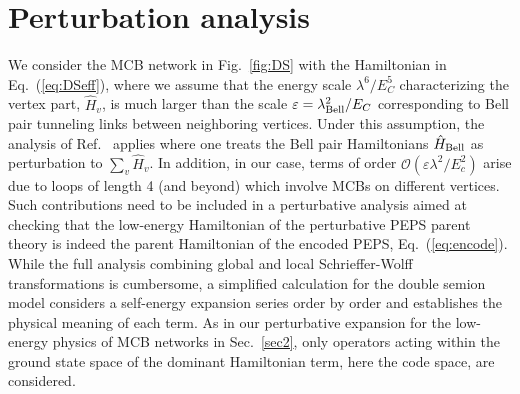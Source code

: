 \documentclass[twocolumn,floats,prx,showpacs]{revtex4-1}
\begin{document}
\appendix*
\section{Perturbation analysis} \label{secA}

We consider the MCB network in Fig.~\ref{fig:DS} with the Hamiltonian in Eq.~(\ref{eq:DSeff}), where we assume that the energy scale $\lambda^6/E_C^5$ characterizing the vertex part, $\hat H_v$, is much larger than the scale $\varepsilon=\lambda_{\rm Bell}^2/E_C$ corresponding to Bell pair tunneling links between neighboring vertices. Under this assumption, the analysis of Ref.~\cite{Brell2014PEPS} applies where one treats the Bell pair Hamiltonians $\hat H_{\rm Bell}$ as perturbation to $\sum_v \hat H_v$.
In addition, in our case, terms of order $\mathcal O(\varepsilon\lambda^2/E_c^2)$ arise due to loops of length 4 (and beyond) which 
involve MCBs on different vertices. Such contributions need to be
included in a perturbative analysis aimed at checking that the low-energy Hamiltonian of the perturbative PEPS parent theory is indeed the parent Hamiltonian of the encoded PEPS, Eq.~(\ref{eq:encode}). While the full analysis combining global and local Schrieffer-Wolff transformations \cite{Bravyi2011} is cumbersome, a simplified calculation \cite{Brell2014} for the double semion model considers a self-energy expansion series order by order and establishes the physical meaning of each term. As in our perturbative expansion for the low-energy physics of MCB networks in Sec.~\ref{sec2}, 
only operators acting within the ground state space of the dominant Hamiltonian term, here the code space, are considered. 
\end{document}
